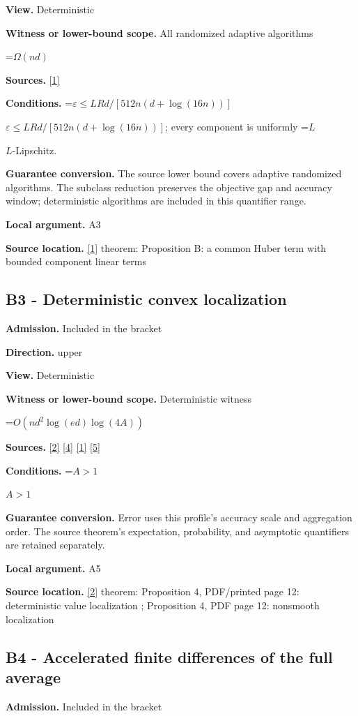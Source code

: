 \documentclass[10pt,a4paper]{article}
\newcommand{\AtlasMath}[1]{\par\begingroup\centering\setbox0=\hbox{$\displaystyle #1$}\ifdim\wd0>1.4\linewidth\typeout{ATLAS WIDE FORMULA: \the\wd0}\fi\ifdim\wd0>\linewidth\resizebox{\linewidth}{!}{\box0}\else\box0\fi\par\endgroup}
\newcommand{\AtlasInlineMath}[1]{\begingroup\setbox0=\hbox{$#1$}\ifdim\wd0>.4\linewidth\endgroup\AtlasMath{#1}\else\endgroup$#1$\fi}
\begin{document}
\textbf{View.} Deterministic

\textbf{Witness or lower-bound scope.} All randomized adaptive algorithms

\AtlasMath{\Omega(nd)}
\textbf{Sources.} \href{https://arxiv.org/html/2610.00345v1}{[1]}

\textbf{Conditions.} \AtlasInlineMath{\varepsilon\le LRd/[512n(d+\log(16n))]}; every component is uniformly \AtlasInlineMath{L}-Lipschitz.

\textbf{Guarantee conversion.} The source lower bound covers adaptive randomized algorithms. The subclass reduction preserves the objective gap and accuracy window; deterministic algorithms are included in this quantifier range.

\textbf{Local argument.} A3

\textbf{Source location.} \href{https://arxiv.org/html/2610.00345v1}{[1]} theorem: Proposition B: a common Huber term with bounded component linear terms

\subsection{B3 - Deterministic convex localization}
\textbf{Admission.} Included in the bracket

\textbf{Direction.} upper

\textbf{View.} Deterministic

\textbf{Witness or lower-bound scope.} Deterministic witness

\AtlasMath{O(nd^2\log(ed)\log(4A))}
\textbf{Sources.} \href{https://arxiv.org/html/2607.16558v2}{[2]} \href{https://www.mathnet.ru/php/archive.phtml?jrnid=mzm&option_lang=eng&paperid=1697&wshow=paper}{[4]} \href{https://arxiv.org/html/2610.00345v1}{[1]} \href{https://arxiv.org/abs/2109.08858}{[5]}

\textbf{Conditions.} \AtlasInlineMath{A>1}

\textbf{Guarantee conversion.} Error uses this profile's accuracy scale and aggregation order. The source theorem's expectation, probability, and asymptotic quantifiers are retained separately.

\textbf{Local argument.} A5

\textbf{Source location.} \href{https://arxiv.org/html/2607.16558v2}{[2]} theorem: Proposition 4, PDF/printed page 12: deterministic value localization ; Proposition 4, PDF page 12: nonsmooth localization

\subsection{B4 - Accelerated finite differences of the full average}
\textbf{Admission.} Included in the bracket
\end{document}
